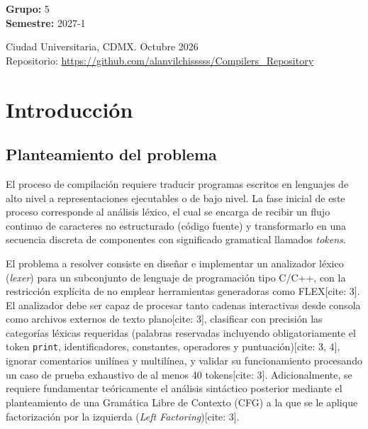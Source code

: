 \documentclass[letterpaper,12pt,oneside]{article}
\begin{document}
\begin{titlepage}
\begin{center}
\begin{center}
            \bigskip
            
            \textbf{Grupo:} 5 \\
            \textbf{Semestre:} 2027-1
        \end{center}
        
        \vfill
        
        \begin{center}
            {Ciudad Universitaria, CDMX. Octubre 2026}\\
            {\footnotesize Repositorio: \url{https://github.com/alanvilchisssss/Compilers_Repository}}
        \end{center}
        \cleardoublepage
    \end{center}
\end{titlepage}

\tableofcontents
\clearpage

\section{Introducción}

\subsection{Planteamiento del problema}
El proceso de compilación requiere traducir programas escritos en lenguajes de alto nivel a representaciones ejecutables o de bajo nivel. La fase inicial de este proceso corresponde al análisis léxico, el cual se encarga de recibir un flujo continuo de caracteres no estructurado (código fuente) y transformarlo en una secuencia discreta de componentes con significado gramatical llamados \textit{tokens}.

El problema a resolver consiste en diseñar e implementar un analizador léxico (\textit{lexer}) para un subconjunto de lenguaje de programación tipo C/C++, con la restricción explícita de no emplear herramientas generadoras como FLEX[cite: 3]. El analizador debe ser capaz de procesar tanto cadenas interactivas desde consola como archivos externos de texto plano[cite: 3], clasificar con precisión las categorías léxicas requeridas (palabras reservadas incluyendo obligatoriamente el token \texttt{print}, identificadores, constantes, operadores y puntuación)[cite: 3, 4], ignorar comentarios unilínea y multilínea, y validar su funcionamiento procesando un caso de prueba exhaustivo de al menos 40 tokens[cite: 3]. Adicionalmente, se requiere fundamentar teóricamente el análisis sintáctico posterior mediante el planteamiento de una Gramática Libre de Contexto (CFG) a la que se le aplique factorización por la izquierda (\textit{Left Factoring})[cite: 3].
\end{document}
